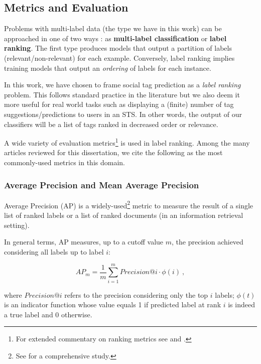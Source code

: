 \subsection{Metrics and Evaluation}

Problems with multi-label data (the type we have in this work) can be approached in one of two ways \citep{tsoumakas_2010,illig_etal_2011}: as \textbf{multi-label classification} or \textbf{label ranking}. The first type produces models that output a partition of labels (relevant/non-relevant) for each example. Conversely, label ranking implies training models that output an \textit{ordering} of labels for each instance. 

In this work, we have chosen to frame social tag prediction as a \textit{label ranking} problem. This follows standard practice in the literature but we also deem it more useful for real world tasks such as displaying a (finite) number of tag suggestions/predictions to users in an STS. In other words, the output of our classifiers will be a list of tags ranked in decreased order or relevance.

A wide variety of evaluation metrics\footnote{For extended commentary on ranking metrics see \cite{sokolova_and_napalme_2009} and \cite{kishida_2005}.} is used in label ranking. Among the many articles reviewed for this dissertation, we cite the following as the most commonly-used metrics in this domain.

\subsubsection{Average Precision and Mean Average Precision}

Average Precision (AP) is a widely-used\footnote{See \cite{buckley_vorhees_2000} for a comprehensive study.} metric to measure the result of a single list of ranked labels or a list of ranked documents (in an information retrieval setting).

In general terms, AP measures, up to a cutoff value $m$, the precision achieved considering all labels up to label $i$:  

\begin{equation}
AP_m =\frac{1}{m} \sum_{i=1}^{m} Precision@i \cdot \phi(i) \ ,
\end{equation}

where $Precision @i$ refers to the precision considering only the top $i$ labels; $\phi(t)$ is an indicator function whose value equals 1 if predicted label at rank $i$ is indeed a true label and 0 otherwise.

